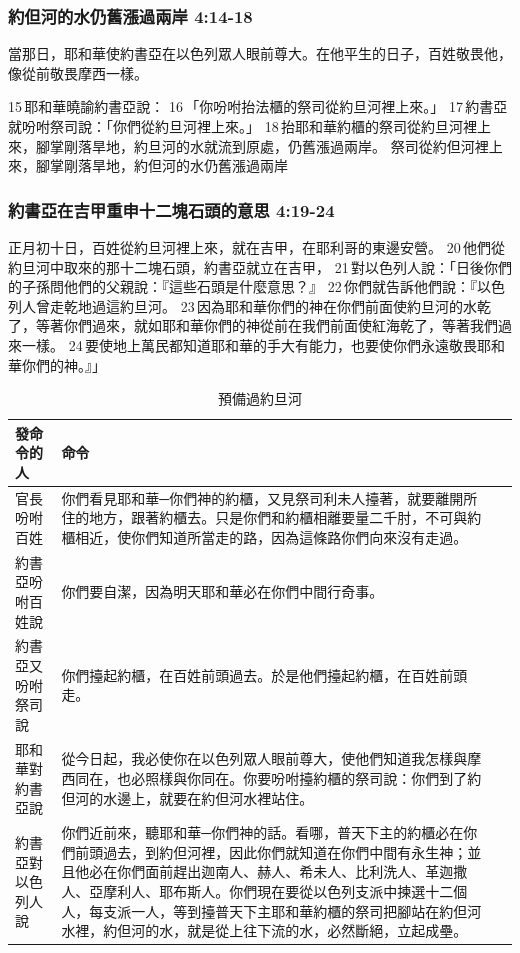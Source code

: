 \subsubsection{約但河的水仍舊漲過兩岸 4:14-18}
當那日，耶和華使約書亞在以色列眾人眼前尊大。在他平生的日子，百姓敬畏他，像從前敬畏摩西一樣。

15 耶和華曉諭約書亞說： 16 「你吩咐抬法櫃的祭司從約旦河裡上來。」 17 約書亞就吩咐祭司說：「你們從約旦河裡上來。」 18 抬耶和華約櫃的祭司從約旦河裡上來，腳掌剛落旱地，約旦河的水就流到原處，仍舊漲過兩岸。
祭司從約但河裡上來，腳掌剛落旱地，約但河的水仍舊漲過兩岸

\subsubsection{約書亞在吉甲重申十二塊石頭的意思 4:19-24}
正月初十日，百姓從約旦河裡上來，就在吉甲，在耶利哥的東邊安營。 20 他們從約旦河中取來的那十二塊石頭，約書亞就立在吉甲， 21 對以色列人說：「日後你們的子孫問他們的父親說：『這些石頭是什麼意思？』 22 你們就告訴他們說：『以色列人曾走乾地過這約旦河。 23 因為耶和華你們的神在你們前面使約旦河的水乾了，等著你們過來，就如耶和華你們的神從前在我們前面使紅海乾了，等著我們過來一樣。 24 要使地上萬民都知道耶和華的手大有能力，也要使你們永遠敬畏耶和華你們的神。』」
    
\begin{table}[H]
\begin{threeparttable}
\begin{tabular}{@{}p{}*{2}{L{\tabcolsep\relax}}@{}}
\toprule
發命令的人 & 命令\\\hline
官長吩咐百姓 & 你們看見耶和華─你們神的約櫃，又見祭司利未人擡著，就要離開所住的地方，跟著約櫃去。只是你們和約櫃相離要量二千肘，不可與約櫃相近，使你們知道所當走的路，因為這條路你們向來沒有走過。 \\\hline
約書亞吩咐百姓說&你們要自潔，因為明天耶和華必在你們中間行奇事。\\\hline
約書亞又吩咐祭司說 & 你們擡起約櫃，在百姓前頭過去。於是他們擡起約櫃，在百姓前頭走。 \\\hline
耶和華對約書亞說 &從今日起，我必使你在以色列眾人眼前尊大，使他們知道我怎樣與摩西同在，也必照樣與你同在。你要吩咐擡約櫃的祭司說：你們到了約但河的水邊上，就要在約但河水裡站住。\\\hline
約書亞對以色列人說& 你們近前來，聽耶和華─你們神的話。看哪，普天下主的約櫃必在你們前頭過去，到約但河裡，因此你們就知道在你們中間有永生神；並且他必在你們面前趕出迦南人、赫人、希未人、比利洗人、革迦撒人、亞摩利人、耶布斯人。你們現在要從以色列支派中揀選十二個人，每支派一人，等到擡普天下主耶和華約櫃的祭司把腳站在約但河水裡，約但河的水，就是從上往下流的水，必然斷絕，立起成壘。\tabularnewline
\hline
\bottomrule
\end{tabular}
\caption{預備過約旦河}
\end{threeparttable}
\end{table} 


